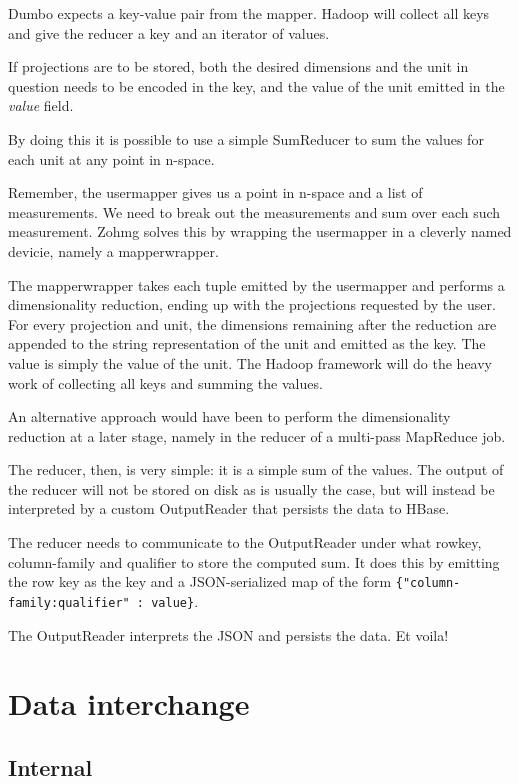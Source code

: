 Dumbo expects a key-value pair from the mapper. Hadoop will collect all keys
and give the reducer a key and an iterator of values.

If projections are to be stored, both the desired dimensions and the unit
in question needs to be encoded in the key, and the value of the unit
emitted in the \textit{value} field.

By doing this it is possible to use a simple SumReducer to sum the values
for each unit at any point in n-space.

Remember, the usermapper gives us a point in n-space and a list of
measurements. We need to break out the measurements and sum over each such
measurement. Zohmg solves this by wrapping the usermapper in a cleverly named
devicie, namely a mapperwrapper.

The mapperwrapper takes each tuple emitted by the usermapper and performs a
dimensionality reduction, ending up with the projections requested by the
user. For every projection and unit, the dimensions remaining after the
reduction are appended to the string representation of the unit and emitted
as the key. The value is simply the value of the unit. The Hadoop framework
will do the heavy work of collecting all keys and summing the values.

An alternative approach would have been to perform the dimensionality
reduction at a later stage, namely in the reducer of a multi-pass MapReduce
job.

The reducer, then, is very simple: it is a simple sum of the values. The output
of the reducer will not be stored on disk as is usually the case, but will
instead be interpreted by a custom OutputReader that persists the data to
HBase.

The reducer needs to communicate to the OutputReader under what rowkey,
column-family and qualifier to store the computed sum. It does this by
emitting the row key as the key and a JSON-serialized map of the form
\texttt{\{"column-family:qualifier" : value\}}.

The OutputReader interprets the JSON and persists the data. Et voila!


\section{Data interchange}

\subsection{Internal}

